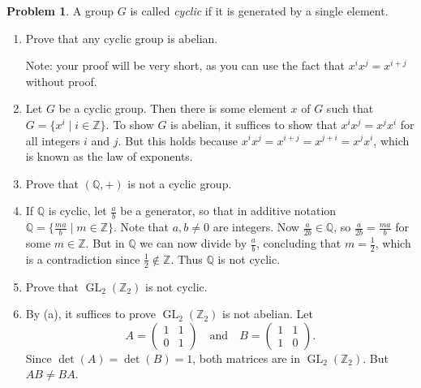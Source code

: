 \documentclass[11pt]{article}
\makeatletter
\renewenvironment{proof}[1][\proofname]{\par
  \vspace{-\topsep}%
  \pushQED{\qed}%
  \normalfont
  \topsep0pt \partopsep0pt %
  \trivlist
  \item[\hskip\labelsep
        \itshape
    #1\@addpunct{.}]\ignorespaces
}{%
  \popQED\endtrivlist\@endpefalse
  \addvspace{6pt plus 6pt} %
}
\newcommand{\Q}{\mathbb{Q}}
\theoremstyle{definition}
\newtheorem{problem}{Problem}
\newtheorem*{solution}{Solution}
\makeatother
\begin{document}
\begin{problem}
	A group $G$ is called {\it cyclic} if it is generated by a single element. 
	
	\begin{enumerate}[label=(\alph*)]
		\item Prove that any cyclic group is abelian.
		
		\noindent Note: your proof will be very short, as you can use the fact that $x^ix^j = x^{i+j}$ without proof.
		
		\begin{proof}
			Let $G$ be a cyclic group.  Then there is some element $x$ of $G$ such that $G=\{x^i\mid i\in \mathbb Z\}$.  To show $G$ is abelian, it suffices to show that $x^ix^j=x^jx^i$ for all integers $i$ and $j$.  But this holds because $x^ix^j = x^{i+j} = x^{j+i} = x^j x^i$, which is known as the law of exponents. %
			\end{proof}
		
%		
%		
		\item Prove that $(\mathbb Q, +)$ is not a cyclic group.

\begin{proof}
	If $\mathbb Q$ is cyclic, let $\frac{a}{b}$ be a generator, so that in additive notation $\mathbb Q=\{\frac{ma}{b}\mid m\in \mathbb Z\}$. Note that $a, b \neq 0$ are integers. Now $\frac{a}{2b} \in \mathbb Q$, so $\frac{a}{2b} = \frac{ma}{b}$ for some $m\in \mathbb Z$. But in $\Q$ we can now divide by $\frac{a}{b}$, concluding that $m = \frac{1}{2}$, which is a contradiction since $\frac{1}{2} \notin \mathbb Z$.  Thus $\mathbb Q$ is not cyclic.
\end{proof}

\item Prove that $\operatorname{GL}_2(\mathbb Z_2)$ is not cyclic.

\begin{proof}
	By (a), it suffices to prove $\operatorname{GL}_2(\mathbb Z_2)$ is not abelian.  Let 
	$$A=\begin{pmatrix} 1 & 1\\ 0 & 1 \end{pmatrix} \quad \textrm{and} \quad B=\begin{pmatrix} 1 & 1\\ 1 & 0 \end{pmatrix}.$$
	Since $\det(A)=\det(B)=1$, both matrices are in $\operatorname{GL}_2(\mathbb Z_2)$.  But $AB\neq BA$.
\end{proof}
	\end{enumerate}
\end{problem}
\end{document}
